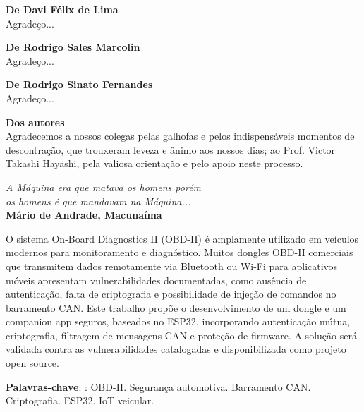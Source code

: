 \documentclass[
	12pt,				%
	openright,			%
	oneside,			%
	a4paper,			%
	english,			%
	french,				%
	spanish,			%
	brazil				%
	]{abntex2}
\begin{document}
\begin{agradecimentos}

\textbf{De Davi Félix de Lima} \\
Agradeço...

\vspace{1em}

\textbf{De Rodrigo Sales Marcolin}\\
Agradeço...

\vspace{1em}

\textbf{De Rodrigo Sinato Fernandes}\\
Agradeço...

\vspace{1em}

\textbf{Dos autores} \\
Agradecemos a nossos colegas pelas galhofas e pelos indispensáveis momentos de descontração, que trouxeram leveza e ânimo aos nossos dias; ao Prof. Victor Takashi Hayashi, pela valiosa orientação e pelo apoio neste processo.

\end{agradecimentos}

\begin{epigrafe}
    \vspace*{\fill}
	\begin{flushright}
		\textit{A Máquina era que matava os homens porém \\ os homens é que mandavam na Máquina... \\}
		 \textbf{Mário de Andrade, Macunaíma}
	\end{flushright}
	
\end{epigrafe}


\setlength{\absparsep}{18pt} %
\begin{resumo}
O sistema On-Board Diagnostics II (OBD-II) é amplamente utilizado em veículos modernos para monitoramento e diagnóstico. Muitos dongles OBD-II comerciais que transmitem dados remotamente via Bluetooth ou Wi-Fi para aplicativos móveis apresentam vulnerabilidades documentadas, como ausência de autenticação, falta de criptografia e possibilidade de injeção de comandos no barramento CAN. Este trabalho propõe o desenvolvimento de um dongle e um companion app seguros, baseados no ESP32, incorporando autenticação mútua, criptografia, filtragem de mensagens CAN e proteção de firmware. A solução será validada contra as vulnerabilidades catalogadas e disponibilizada como projeto open source.

 \textbf{Palavras-chave}: : OBD-II. Segurança automotiva. Barramento CAN. Criptografia. ESP32. IoT veicular.
\end{resumo}
\end{document}
